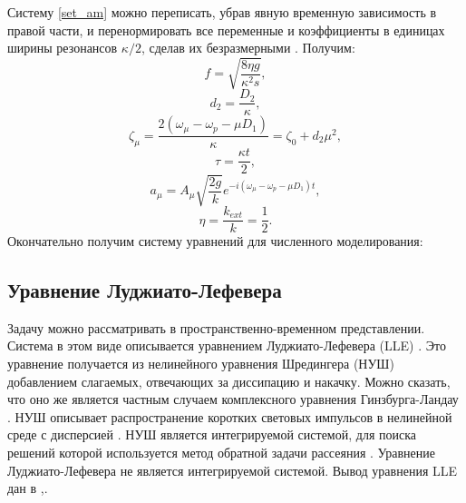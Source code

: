 Систему \eqref{set_am} можно переписать, убрав явную временную зависимость в правой части, и перенормировать все переменные и коэффициенты в единицах ширины резонансов $\kappa/2$, сделав их безразмерными \cite{MLG_nature_2012}. Получим:
\begin{equation}
f=\sqrt{\frac{8\eta g}{\kappa^2s}},
\end{equation}
\begin{equation}
d_2=\frac{D_2}{\kappa},
\end{equation}
\begin{equation}
\zeta_\mu=\frac{2(\omega_\mu-\omega_p-\mu D_1)}{\kappa}=\zeta_0+d_2\mu^2,
\end{equation}
\begin{equation}
\tau=\frac{\kappa t}{2},
\end{equation}
\begin{equation}\label{normirovka}
a_\mu=A_\mu\sqrt{\frac{2g}{k}}e^{-i(\omega_\mu-\omega_p-\mu D_1)t},
\end{equation}
\begin{equation}
\eta=\frac{k_{ext}}{k}=\frac{1}{2}.
\end{equation}
Окончательно получим систему уравнений для численного моделирования:


\subsection{Уравнение Луджиато-Лефевера}

Задачу можно рассматривать в пространственно-временном представлении. Система в этом виде описывается уравнением Луджиато-Лефевера (LLE) \cite{lugiato}. Это уравнение получается из нелинейного уравнения Шредингера (НУШ) добавлением слагаемых, отвечающих за диссипацию и накачку. Можно сказать, что оно же является частным случаем комплексного уравнения Гинзбурга-Ландау \cite{dissipative_solitons}. НУШ описывает распространение коротких световых импульсов в нелинейной среде с дисперсией \cite{boyd}. НУШ является интегрируемой системой, для поиска решений которой используется метод обратной задачи рассеяния \cite{ahm_solitons}. Уравнение Луджиато-Лефевера не является интегрируемой системой. Вывод уравнения LLE дан в \cite{matsko_nls},\cite{chembo_nls}.

